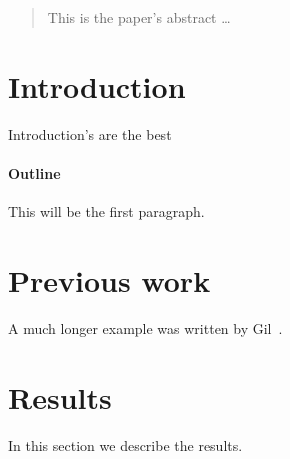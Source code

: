 \documentclass[12pt]{article}
\begin{document}
\maketitle

\begin{abstract}
This is the paper's abstract \ldots
\end{abstract}

\section{Introduction}
Introduction's are the best

\paragraph{Outline}
This will be the first paragraph.

\section{Previous work}\label{previous work}
A much longer \LaTeXe{} example was written by Gil~\cite{Gil:02}.

\section{Results}\label{results}
In this section we describe the results.




\end{document}
